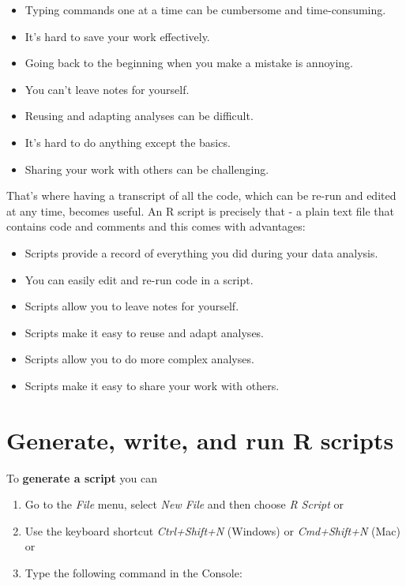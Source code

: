 \documentclass[
  12pt,
  oneside]{book}
\providecommand{\tightlist}{%
  \setlength{\itemsep}{0pt}\setlength{\parskip}{0pt}}
\theoremstyle{definition}
\theoremstyle{definition}
\theoremstyle{definition}
\theoremstyle{definition}
\theoremstyle{remark}
\begin{document}
\begin{itemize}
\tightlist
\item
  Typing commands one at a time can be cumbersome and time-consuming.
\item
  It's hard to save your work effectively.
\item
  Going back to the beginning when you make a mistake is annoying.
\item
  You can't leave notes for yourself.
\item
  Reusing and adapting analyses can be difficult.
\item
  It's hard to do anything except the basics.
\item
  Sharing your work with others can be challenging.
\end{itemize}

That's where having a transcript of all the code, which can be re-run and edited at any time, becomes useful. An R script is precisely that - a plain text file that contains code and comments and this comes with advantages:

\begin{itemize}
\tightlist
\item
  Scripts provide a record of everything you did during your data analysis.
\item
  You can easily edit and re-run code in a script.
\item
  Scripts allow you to leave notes for yourself.
\item
  Scripts make it easy to reuse and adapt analyses.
\item
  Scripts allow you to do more complex analyses.
\item
  Scripts make it easy to share your work with others.
\end{itemize}

\hypertarget{generate-write-and-run-r-scripts}{%
\section{Generate, write, and run R scripts}\label{generate-write-and-run-r-scripts}}

To \textbf{generate a script} you can

\begin{enumerate}
\def\labelenumi{\arabic{enumi}.}
\tightlist
\item
  Go to the \emph{File} menu, select \emph{New File} and then choose \emph{R Script} or
\item
  Use the keyboard shortcut \emph{Ctrl+Shift+N} (Windows) or \emph{Cmd+Shift+N} (Mac) or
\item
  Type the following command in the Console:
\end{enumerate}
\end{document}
